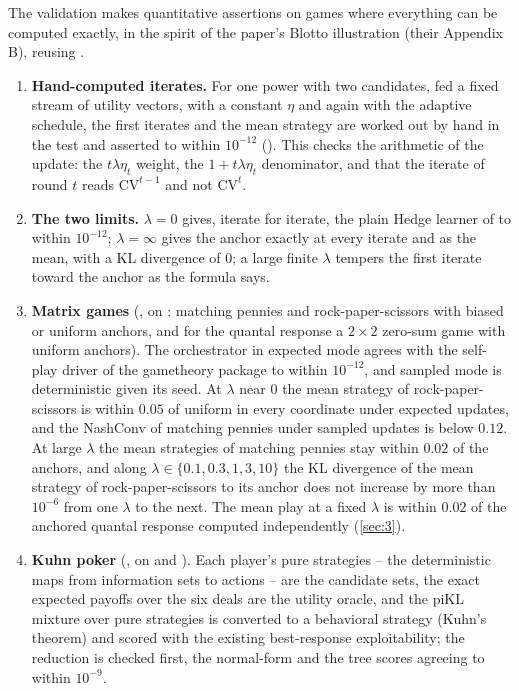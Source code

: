 \documentclass[12pt,a4paper]{article}
\begin{document}
The validation makes quantitative assertions on games where everything can be computed exactly, in the spirit of the paper's Blotto illustration (their Appendix B), reusing .
\begin{enumerate}
\item \textbf{Hand-computed iterates.}
For one power with two candidates, fed a fixed stream of utility vectors, with a constant $\eta$ and again with the adaptive schedule, the first iterates and the mean strategy are worked out by hand in the test and asserted to within $10^{-12}$ ().
This checks the arithmetic of the update: the $t \lambda \eta_t$ weight, the $1 + t \lambda \eta_t$ denominator, and that the iterate of round $t$ reads $\mathrm{CV}^{t-1}$ and not $\mathrm{CV}^{t}$.
\item \textbf{The two limits.}
$\lambda = 0$ gives, iterate for iterate, the plain Hedge learner of  to within $10^{-12}$; $\lambda = \infty$ gives the anchor exactly at every iterate and as the mean, with a KL divergence of 0; a large finite $\lambda$ tempers the first iterate toward the anchor as the formula says.
\item \textbf{Matrix games} (, on : matching pennies and rock-paper-scissors with biased or uniform anchors, and for the quantal response a $2 \times 2$ zero-sum game with uniform anchors).
The orchestrator  in expected mode agrees with the self-play driver of the gametheory package to within $10^{-12}$, and sampled mode is deterministic given its seed.
At $\lambda$ near 0 the mean strategy of rock-paper-scissors is within $0.05$ of uniform in every coordinate under expected updates, and the NashConv of matching pennies under sampled updates is below $0.12$.
At large $\lambda$ the mean strategies of matching pennies stay within $0.02$ of the anchors, and along $\lambda \in \{0.1, 0.3, 1, 3, 10\}$ the KL divergence of the mean strategy of rock-paper-scissors to its anchor does not increase by more than $10^{-6}$ from one $\lambda$ to the next.
The mean play at a fixed $\lambda$ is within $0.02$ of the anchored quantal response computed independently (\cref{sec:3}).
\item \textbf{Kuhn poker} (, on  and ).
Each player's pure strategies -- the deterministic maps from information sets to actions -- are the candidate sets, the exact expected payoffs over the six deals are the utility oracle, and the piKL mixture over pure strategies is converted to a behavioral strategy (Kuhn's theorem) and scored with the existing best-response exploitability; the reduction is checked first, the normal-form and the tree scores agreeing to within $10^{-9}$.

\end{enumerate}
\end{document}
